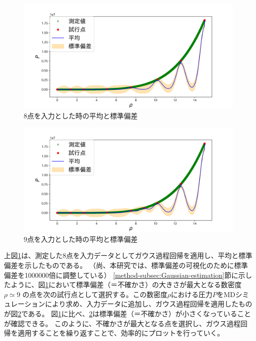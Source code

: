 \documentclass[titlepage]{jsreport}
\begin{document}
{{{\begin{figure}[htbp]
    \begin{center}
        \includegraphics[width=13cm]{fig/8plot-Gauss.png}
    \end{center}
    \caption{8点を入力とした時の平均と標準偏差}
    \label{fig:8plot}
\end{figure}

\begin{figure}[htbp]
    \begin{center}
        \includegraphics[width=13cm]{fig/9plot-Gauss.png}
    \end{center}
    \caption{9点を入力とした時の平均と標準偏差}
    \label{fig:9plot}
\end{figure}

\newpage
上図\ref{fig:8plot}は、測定した8点を入力データとしてガウス過程回帰を適用し、平均と標準偏差を示したものである。
（尚、本研究では、標準偏差の可視化のために標準偏差を1000000倍に調整している）
\ref{method-subsec:Gaussian-estimation}節に示したように、図\ref{fig:8plot}において標準偏差（＝不確かさ）の大きさが最大となる数密度${\rho}\simeq9$
の点を次の試行点として選択する。この数密度$\rho$における圧力$P$をMDシミュレーションにより求め、入力データに追加し、ガウス過程回帰を適用したものが図\ref{fig:9plot}である。
図\ref{fig:8plot}に比べ、\ref{fig:9plot}は標準偏差（＝不確かさ）が小さくなっていることが確認できる。
このように、不確かさが最大となる点を選択し、ガウス過程回帰を適用することを繰り返すことで、効率的にプロットを行っていく。

}}}
\end{document}
